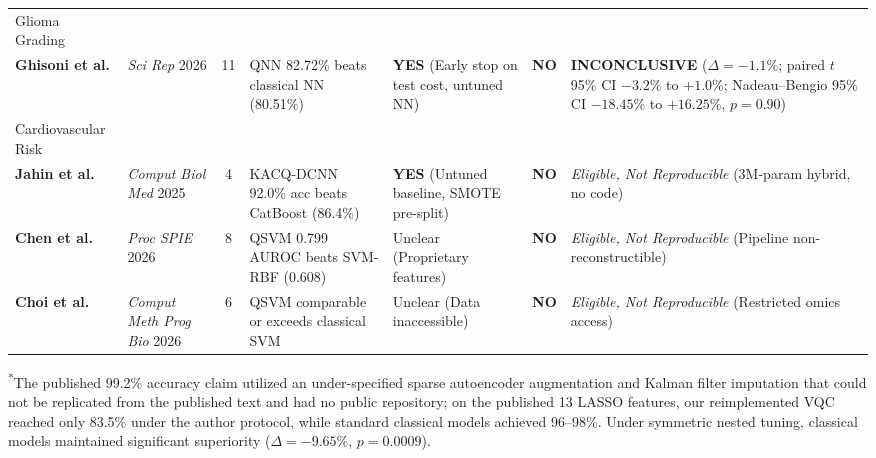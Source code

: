 \documentclass[10pt,a4paper,twoside]{article}
\begin{document}
\begin{table}[t]
\begin{tabular}{p{3.0cm} p{2.2cm} c p{3.2cm} p{2.8cm} c p{3.2cm}}
Glioma Grading & & & & & & \\
\addlinespace
\textbf{Ghisoni et al.} & \textit{Sci Rep} 2026 \cite{ghisoni2026} & 11 & QNN 82.72\% beats classical NN (80.51\%) & \textbf{YES} (Early stop on test cost, untuned NN) & \textbf{NO} & \textbf{INCONCLUSIVE} ($\Delta = -1.1\%$; paired $t$ 95\% CI $-3.2\%$ to $+1.0\%$; Nadeau--Bengio 95\% CI $-18.45\%$ to $+16.25\%$, $p = 0.90$) \\
Cardiovascular Risk & & & & & & \\
\addlinespace
\textbf{Jahin et al.} & \textit{Comput Biol Med} 2025 \cite{jahin2025} & 4 & KACQ-DCNN 92.0\% acc beats CatBoost (86.4\%) & \textbf{YES} (Untuned baseline, SMOTE pre-split) & \textbf{NO} & \textit{Eligible, Not Reproducible} (3M-param hybrid, no code) \\
\addlinespace
\textbf{Chen et al.} & \textit{Proc SPIE} 2026 \cite{chen2026} & 8 & QSVM 0.799 AUROC beats SVM-RBF (0.608) & Unclear (Proprietary features) & \textbf{NO} & \textit{Eligible, Not Reproducible} (Pipeline non-reconstructible) \\
\addlinespace
\textbf{Choi et al.} & \textit{Comput Meth Prog Bio} 2026 \cite{choi2026} & 6 & QSVM comparable or exceeds classical SVM & Unclear (Data inaccessible) & \textbf{NO} & \textit{Eligible, Not Reproducible} (Restricted omics access) \\
\bottomrule
\end{tabular}
\vspace{2pt}
\begin{flushleft}
\footnotesize\textsuperscript{*}The published 99.2\% accuracy claim utilized an under-specified sparse autoencoder augmentation and Kalman filter imputation that could not be replicated from the published text and had no public repository; on the published 13 LASSO features, our reimplemented VQC reached only 83.5\% under the author protocol, while standard classical models achieved 96--98\%. Under symmetric nested tuning, classical models maintained significant superiority ($\Delta = -9.65\%$, $p = 0.0009$).
\end{flushleft}
\vspace{4pt}
\end{table}
\end{document}
